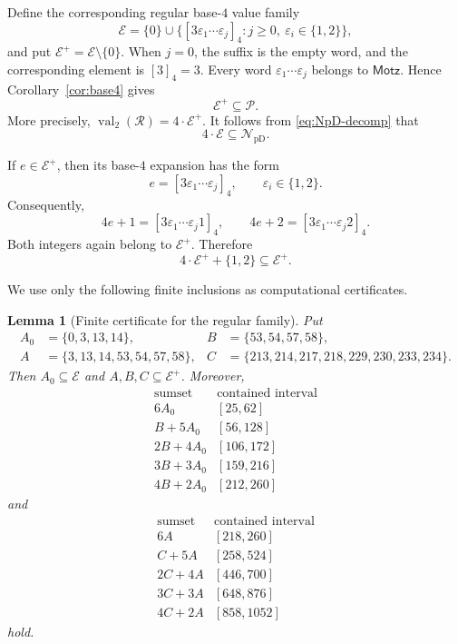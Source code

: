 \documentclass[11pt]{article}
\theoremstyle{plain}
\newtheorem{lemma}[theorem]{Lemma}
\theoremstyle{definition}
\newcommand{\NpD}{\mathcal{N}_{\mathrm{pD}}}
\newcommand{\Pset}{\mathcal P}
\begin{document}
Define the corresponding regular base-$4$ value family
\[
 \mathcal E=\{0\}\cup
 \bigl\{[3\varepsilon_1\cdots\varepsilon_j]_4:
        j\geq0,\ \varepsilon_i\in\{1,2\}\bigr\},
\]
and put $\mathcal E^+=\mathcal E\setminus\{0\}$.  When $j=0$, the
suffix is the empty word, and the corresponding element is $[3]_4=3$.
Every word $\varepsilon_1\cdots\varepsilon_j$ belongs to
$\mathsf{Motz}$.  Hence Corollary~\ref{cor:base4} gives
\[
 \mathcal E^+\subseteq\Pset.
\]
More precisely, $\operatorname{val}_2(\mathcal R)=4\cdot\mathcal E^+$.  It follows from \eqref{eq:NpD-decomp} that
\begin{equation}\label{eq:4E}
 4\cdot\mathcal E\subseteq\NpD.
\end{equation}

If $e\in\mathcal E^+$, then its base-$4$ expansion has the form
\[
 e=[3\varepsilon_1\cdots\varepsilon_j]_4,
 \qquad \varepsilon_i\in\{1,2\}.
\]
Consequently,
\[
 4e+1=[3\varepsilon_1\cdots\varepsilon_j1]_4,
 \qquad
 4e+2=[3\varepsilon_1\cdots\varepsilon_j2]_4.
\]
Both integers again belong to $\mathcal E^+$.  Therefore
\begin{equation}\label{eq:Eclosure}
 4\cdot\mathcal E^++\{1,2\}\subseteq\mathcal E^+.
\end{equation}

We use only the following finite inclusions as computational certificates.

\begin{lemma}[Finite certificate for the regular family]
\label{lem:Ecertificate}
Put
\[
\begin{aligned}
 A_0&=\{0,3,13,14\},
 &B&=\{53,54,57,58\},\\
 A&=\{3,13,14,53,54,57,58\},
 &C&=\{213,214,217,218,229,230,233,234\}.
\end{aligned}
\]
Then $A_0\subseteq\mathcal E$ and $A,B,C\subseteq\mathcal E^+$.
Moreover,
\begin{equation}\label{eq:E-small-certificate}
\begin{array}{c|c}
\text{sumset}&\text{contained interval}\\ \hline
6A_0 &[25,62]\\
B+5A_0 &[56,128]\\
2B+4A_0 &[106,172]\\
3B+3A_0 &[159,216]\\
4B+2A_0 &[212,260]
\end{array}
\end{equation}
and
\begin{equation}\label{eq:E-tail-certificate}
\begin{array}{c|c}
\text{sumset}&\text{contained interval}\\ \hline
6A &[218,260]\\
C+5A &[258,524]\\
2C+4A &[446,700]\\
3C+3A &[648,876]\\
4C+2A &[858,1052]
\end{array}
\end{equation}
hold.
\end{lemma}
\end{document}
